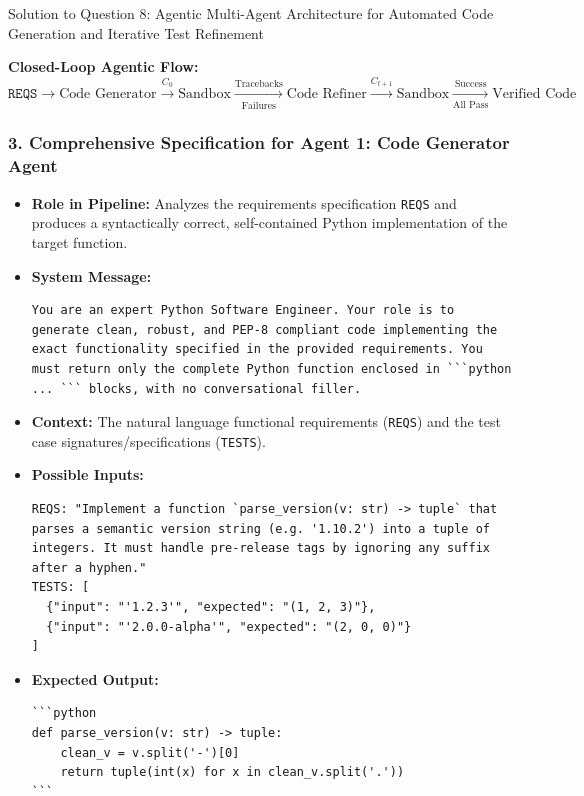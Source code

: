 \documentclass[11pt,a4paper]{article}
\begin{document}
\begin{solutionbox}{Solution to Question 8: Agentic Multi-Agent Architecture for Automated Code Generation and Iterative Test Refinement}
\begin{center}
\begin{tcolorbox}[colback=white,colframe=secondary,arc=1mm,boxrule=0.6pt,width=0.95\textwidth]
\small\centering
\textbf{Closed-Loop Agentic Flow:}\\
$\texttt{REQS} \longrightarrow \text{Code Generator} \xrightarrow{C_0} \text{Sandbox} \xrightarrow[\text{Failures}]{\text{Tracebacks}} \text{Code Refiner} \xrightarrow{C_{t+1}} \text{Sandbox} \xrightarrow[\text{All Pass}]{\text{Success}} \text{Verified Code}$
\end{tcolorbox}
\end{center}

\subsubsection*{3. Comprehensive Specification for Agent 1: Code Generator Agent}
\begin{itemize}[leftmargin=1.5em]
    \item \textbf{Role in Pipeline:} Analyzes the requirements specification \texttt{REQS} and produces a syntactically correct, self-contained Python implementation of the target function.
    \item \textbf{System Message:}
\begin{lstlisting}[style=diffstyle]
You are an expert Python Software Engineer. Your role is to generate clean, robust, and PEP-8 compliant code implementing the exact functionality specified in the provided requirements. You must return only the complete Python function enclosed in ```python ... ``` blocks, with no conversational filler.
\end{lstlisting}
    \item \textbf{Context:} The natural language functional requirements (\texttt{REQS}) and the test case signatures/specifications (\texttt{TESTS}).
    \item \textbf{Possible Inputs:}
\begin{lstlisting}[style=diffstyle]
REQS: "Implement a function `parse_version(v: str) -> tuple` that parses a semantic version string (e.g. '1.10.2') into a tuple of integers. It must handle pre-release tags by ignoring any suffix after a hyphen."
TESTS: [
  {"input": "'1.2.3'", "expected": "(1, 2, 3)"},
  {"input": "'2.0.0-alpha'", "expected": "(2, 0, 0)"}
]
\end{lstlisting}
    \item \textbf{Expected Output:}
\begin{lstlisting}[style=diffstyle]
```python
def parse_version(v: str) -> tuple:
    clean_v = v.split('-')[0]
    return tuple(int(x) for x in clean_v.split('.'))
```
\end{lstlisting}
\end{itemize}


\end{solutionbox}
\end{document}
